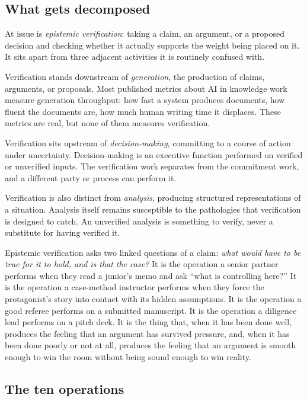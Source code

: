 \documentclass[
  11pt,
]{article}
\begin{document}
\subsection{What gets decomposed}\label{what-gets-decomposed}

At issue is \emph{epistemic verification}: taking a claim, an
argument, or a proposed decision and checking whether it actually
supports the weight being placed on it. It sits apart from three adjacent
activities it is routinely confused with.

Verification stands downstream of \emph{generation}, the production of
claims, arguments, or proposals. Most published metrics about AI in
knowledge work measure generation throughput: how fast a system produces
documents, how fluent the documents are, how much human writing time it
displaces. These metrics are real, but none of them measures verification.

Verification sits upstream of \emph{decision-making}, committing
to a course of action under uncertainty. Decision-making is an
executive function performed on verified or unverified inputs. The
verification work separates from the commitment work, and a
different party or process can perform it.

Verification is also distinct from \emph{analysis}, producing
structured representations of a situation. Analysis itself remains
susceptible to the pathologies that verification is designed to catch. An
unverified analysis is something to verify, never a substitute for having
verified it.

Epistemic verification asks two linked questions of a claim: \emph{what
would have to be true for it to hold, and is that the case?} It is the operation a senior partner
performs when they read a junior's memo and ask ``what is controlling
here?'' It is the operation a case-method instructor performs when they
force the protagonist's story into contact with its hidden assumptions.
It is the operation a good referee performs on a submitted manuscript.
It is the operation a diligence lead performs on a pitch deck. It is the
thing that, when it has been done well, produces the feeling that an
argument has survived pressure, and, when it has been done poorly or not
at all, produces the feeling that an argument is smooth enough to win
the room without being sound enough to win reality.

\subsection{The ten operations}\label{the-ten-operations}
\end{document}
